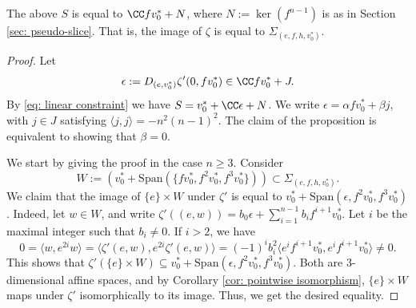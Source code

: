 \documentclass[11pt]{article}
\begin{document}
\begin{proposition}
    The above $S$ is equal to $\CC fv_0^*+N$, where $N:=\ker(f^{n-1})$ is as in Section \ref{sec: pseudo-slice}. That is, the image of $\zeta$ is equal to $\Sigma_{(e, f, h, v_0^*)}$.
\end{proposition}
\begin{proof}
    Let $$\epsilon := D_{(e,v_0^*)}\zeta'(0, fv_0^*)\in \CC fv_0^* + J.$$ By \eqref{eq: linear constraint} we have $S = v_0^* + \CC \epsilon + N$. We write $\epsilon = \alpha fv_0^* + \beta j$, with $j\in J$ satisfying $\langle j, j\rangle = -n^2(n-1)^2$.
    The claim of the proposition is equivalent to showing that $\beta=0$.
    
    We start by giving the proof in the case $n\geq 3$.
    Consider $$W:=\left(v_0^*+\mathrm{Span}(\{fv_0^*, f^2v_0^*, f^3v_0^*\})\right)\subset \Sigma_{(e, f, h, v_0^*)}.$$
    We claim that the image of $\{e\}\times W$ under $\zeta'$ is equal to $v_0^* + \mathrm{Span}(\epsilon, f^2v_0^*, f^3v_0^*)$.
    Indeed, let $w\in W$, and write $\zeta'((e, w))=b_0\epsilon + \sum_{i=1}^{n-1}b_i f^{i+1}v_0^*$. Let $i$ be the maximal integer such that $b_i\neq 0$.
    If $i > 2$, we have
    $$0 = \langle w, e^{2i} w\rangle = \langle \zeta'(e, w), e^{2i} \zeta'(e, w)\rangle = (-1)^i b_i^2 \langle e^if^{i+1}v_0^*, e^if^{i+1}v_0^*\rangle \neq 0.$$
    This shows that $\zeta'(\{e\}\times W)\subseteq v_0^* + \mathrm{Span}(\epsilon, f^2v_0^*, f^3v_0^*)$. Both are 3-dimensional affine spaces, and by Corollary \ref{cor: pointwise isomorphism}, $\{e\}\times W$ maps under $\zeta'$ isomorphically to its image. Thus, we get the desired equality.


\end{proof}
\end{document}
